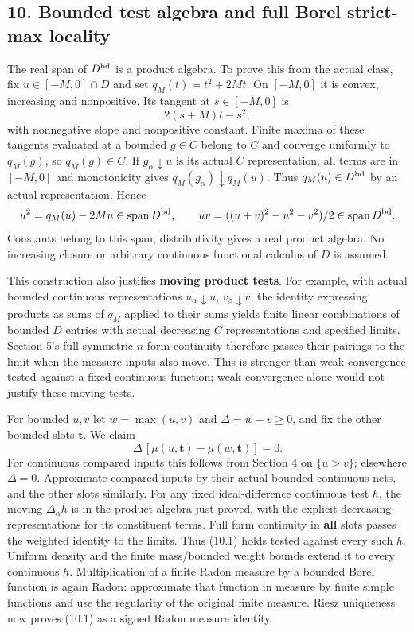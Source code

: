 \documentclass[
]{article}
\begin{document}
\subsection{10. Bounded test algebra and full Borel strict-max
locality}\label{bounded-test-algebra-and-full-borel-strict-max-locality}

The real span of \(D^{\rm bd}\) is a product algebra. To prove this from
the actual class, fix \(u\in[-M,0]\cap D\) and set \(q_M(t)=t^2+2Mt\).
On \([-M,0]\) it is convex, increasing and nonpositive. Its tangent at
\(s\in[-M,0]\) is \[2(s+M)t-s^2,\] with nonnegative slope and
nonpositive constant. Finite maxima of these tangents evaluated at a
bounded \(g\in C\) belong to \(C\) and converge uniformly to \(q_M(g)\),
so \(q_M(g)\in C\). If \(g_\alpha\downarrow u\) is its actual \(C\)
representation, all terms are in \([-M,0]\) and monotonicity gives
\(q_M(g_\alpha)\downarrow q_M(u)\). Thus \(q_M(u)\in D^{\rm bd}\) by an
actual representation. Hence
\[u^2=q_M(u)-2Mu\in\operatorname{span}D^{\rm bd},\qquad
uv=((u+v)^2-u^2-v^2)/2\in\operatorname{span}D^{\rm bd}.\] Constants
belong to this span; distributivity gives a real product algebra. No
increasing closure or arbitrary continuous functional calculus of \(D\)
is assumed.

This construction also justifies \textbf{moving product tests}. For
example, with actual bounded continuous representations
\(u_\alpha\downarrow u\), \(v_\beta\downarrow v\), the identity
expressing products as sums of \(q_M\) applied to their sums yields
finite linear combinations of bounded \(D\) entries with actual
decreasing \(C\) representations and specified limits. Section 5's full
symmetric \(n\)-form continuity therefore passes their pairings to the
limit when the measure inputs also move. This is stronger than weak
convergence tested against a fixed continuous function; weak convergence
alone would not justify these moving tests.

For bounded \(u,v\) let \(w=\max(u,v)\) and \(\Delta=w-v\ge0\), and fix
the other bounded slots \(\boldsymbol t\). We claim
\[\Delta\,[\mu(u,\boldsymbol t)-\mu(w,\boldsymbol t)]=0.\tag{10.1}\] For
continuous compared inputs this follows from Section 4 on \(\{u>v\}\);
elsewhere \(\Delta=0\). Approximate compared inputs by their actual
bounded continuous nets, and the other slots similarly. For any fixed
ideal-difference continuous test \(h\), the moving \(\Delta_\alpha h\)
is in the product algebra just proved, with the explicit decreasing
representations for its constituent terms. Full form continuity in
\textbf{all} slots passes the weighted identity to the limits. Thus
(10.1) holds tested against every such \(h\). Uniform density and the
finite mass/bounded weight bounds extend it to every continuous \(h\).
Multiplication of a finite Radon measure by a bounded Borel function is
again Radon: approximate that function in measure by finite simple
functions and use the regularity of the original finite measure. Riesz
uniqueness now proves (10.1) as a signed Radon measure identity.
\end{document}
